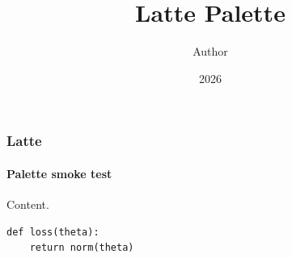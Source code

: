 \documentclass[notheorems,aspectratio=169]{beamer}
\title{Latte Palette}
\author{Author}
\date{2026}
\begin{document}
\maketitle

\begin{frame}[fragile]
  \frametitle{Latte}
  \framesubtitle{Palette smoke test}

  Content.

  \begin{verbatim}
def loss(theta):
    return norm(theta)
  \end{verbatim}
\end{frame}
\end{document}
